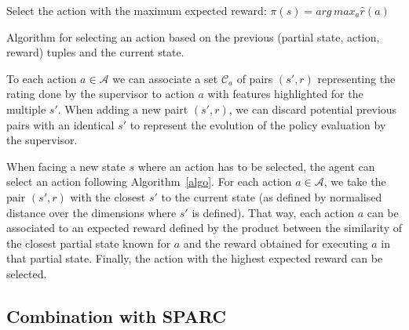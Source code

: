 \documentclass[letterpaper]{article} %
\begin{document}
\begin{algorithm}
    \DontPrintSemicolon
    Select the action with the maximum expected reward:
    $\pi(s) = arg\, max_{a} \hat{r}(a)$

    \caption{Algorithm for selecting an action based on the previous
    (partial state, action, reward) tuples and the current state.}
    \label{algo}
\end{algorithm}

To each action
$a \in \mathcal{A}$ we can associate a set $\mathcal{C}_{a}$ of pairs $(s',r)$
representing the rating done by the supervisor to action $a$ with features
highlighted for the multiple $s'$. When adding a new pairt $(s',r)$, we can discard potential
previous pairs with an identical $s'$ to represent the evolution of the policy
evaluation by the supervisor.


When facing a new state $s$ where an action has to be
selected, the agent can select an action following Algorithm~\ref{algo}. For
each action $a \in \mathcal{A}$, we take the pair $(s',r)$ with the closest $s'$
to the current state (as defined by normalised distance over the dimensions
where $s'$ is defined). That way, each action $a$ can be associated to an
expected reward defined by the product between the similarity of the closest
partial state known for $a$ and the reward obtained for executing $a$ in that partial state.
Finally, the action with the highest expected reward can be selected.


\subsection{Combination with SPARC}
\end{document}
